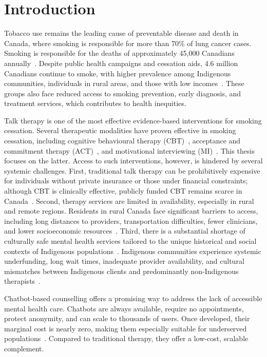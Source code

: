 \chapter{Introduction}

Tobacco use remains the leading cause of preventable disease and death in Canada, where smoking is responsible for more than 70\% of lung cancer cases. Smoking is responsible for the deaths of approximately 45,000 Canadians annually~\cite{poirier2019estimates}. Despite public health campaigns and cessation aids, 4.6 million Canadians continue to smoke, with higher prevalence among Indigenous communities, individuals in rural areas, and those with low incomes~\cite{cpac2020lung}. These groups also face reduced access to smoking prevention, early diagnosis, and treatment services, which contributes to health inequities.

Talk therapy is one of the most effective evidence-based interventions for smoking cessation. Several therapeutic modalities have proven effective in smoking cessation, including cognitive behavioural therapy (CBT)~\cite{beck2011cognitive}, acceptance and commitment therapy (ACT)~\cite{hayes1999acceptance}, and motivational interviewing (MI)~\cite{MillerRollnick2023}. This thesis focuses on the latter. Access to such interventions, however, is hindered by several systemic challenges. First, traditional talk therapy can be prohibitively expensive for individuals without private insurance or those under financial constraints; although CBT is clinically effective, publicly funded CBT remains scarce in Canada~\cite{doi:10.1177/0253717620957496,doi:10.1177/0706743716642416}. Second, therapy services are limited in availability, especially in rural and remote regions. Residents in rural Canada face significant barriers to access, including long distances to providers, transportation difficulties, fewer clinicians, and lower socioeconomic resources~\cite{burns2007rural,james2021improving}. Third, there is a substantial shortage of culturally safe mental health services tailored to the unique historical and social contexts of Indigenous populations~\cite{josewski2023improving,hartwasekeesikaw2009cultural}. Indigenous communities experience systemic underfunding, long wait times, inadequate provider availability, and cultural mismatches between Indigenous clients and predominantly non-Indigenous therapists~\cite{turner2018poverty}.

Chatbot-based counselling offers a promising way to address the lack of accessible mental health care. Chatbots are always available, require no appointments, protect anonymity, and can scale to thousands of users. Once developed, their marginal cost is nearly zero, making them especially suitable for underserved populations~\cite{torous2017digital,miner2016smartphone}. Compared to traditional therapy, they offer a low-cost, scalable complement.

